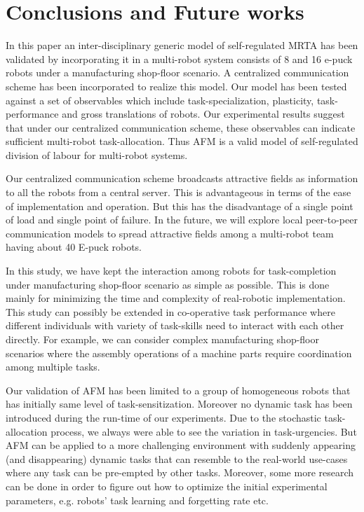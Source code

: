 \documentclass[smallcondensed]{svjour3}
\begin{document}
\section{Conclusions and Future works}
\label{sec:conc}
In this paper  an inter-disciplinary generic model of self-regulated MRTA has been validated by incorporating it in a multi-robot system consists of 8 and 16 e-puck robots under a manufacturing shop-floor scenario. A centralized communication scheme has been incorporated to realize this model. Our model has been tested against a set of observables which include task-specialization, plasticity, task-performance and gross translations of robots.  Our experimental results suggest that under our centralized  communication scheme, these observables can indicate sufficient multi-robot task-allocation.  Thus AFM is a valid model of  self-regulated division of labour for multi-robot systems.

Our centralized communication scheme broadcasts attractive fields as information to all the robots from a central server. This is advantageous in terms of the ease of implementation and operation. But this has the disadvantage of a single point of load and single point of failure. In the future, we will explore local peer-to-peer communication models to spread attractive fields among a multi-robot team having about 40 E-puck robots.

In this study, we have kept the interaction among robots for task-completion under manufacturing shop-floor scenario as simple as possible. This is done mainly for minimizing the time and complexity of real-robotic implementation. This study can possibly be extended in co-operative task performance where different individuals with variety of task-skills need to interact with each other directly. For example, we can consider complex manufacturing shop-floor scenarios where the assembly operations of a machine parts require coordination among multiple tasks. 

Our validation of AFM has been limited to a group of homogeneous robots that has initially same level of task-sensitization. Moreover no dynamic task has been introduced during the run-time of our experiments. Due to the stochastic task-allocation process, we always were able to see the  variation in task-urgencies. But AFM can be applied to a more challenging environment with suddenly appearing (and disappearing) dynamic tasks that can resemble to the real-world use-cases where any task can be pre-empted by other tasks. Moreover, some more research can be done in order to figure out how to optimize the initial experimental parameters, e.g. robots' task learning and forgetting rate etc. 
\end{document}
